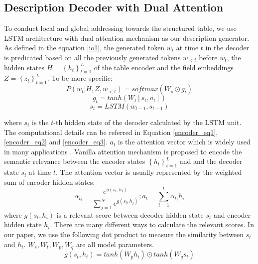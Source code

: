 \documentclass[letterpaper]{article} %
\begin{document}
\subsection{Description Decoder with Dual Attention}
To conduct local and global addressing towards the structured table, we use LSTM architecture with dual attention mechanism as our description generator. As defined in the equation \ref{io1}, the generated token $w_t$  at time $t$ in the decoder is predicated based on all the previously generated tokens $w_{<t}$ before $w_t$, the hidden states $H=\left\{h_t\right\}_{t=1}^{L}$ of the table encoder and the field embeddings $Z=\left\{z_t\right\}_{t=1}^{L}$. To be more specific:
\begin{equation}
P(w_t|H,Z,w_{<t}) = softmax(W_s\odot g_t)
\end{equation}
\begin{equation}
g_t = tanh(W_t[s_t,a_t])
\end{equation}
\begin{equation}
s_t = LSTM(w_{t-1}, s_{t-1})
\end{equation}

where $s_t$ is the $t$-th hidden state of the decoder calculated by the LSTM unit. The computational details can be referred in Equation \ref{encoder_eq1}, \ref{encoder_eq2} and \ref{encoder_eq3}. $a_t$ is the attention vector which is widely used in many applications \cite{xu2015show,luong2014addressing,DBLP:conf/acl/MaSXWLS17}. 
Vanilla attention mechanism is proposed to encode the semantic relevance between the encoder states $\left\{h_t\right\}_{t=1}^{L}$ and and the decoder state $s_t$ at time $t$. The attention vector is usually represented by the weighted sum of encoder hidden states.
\begin{equation}
	  \alpha_{t_i}=\frac{e^{g(s_{t},h_{i})}}{\sum_{j=1}^{N}{e^{g(s_{t},h_{j})}}}; a_t = \sum_{i=1}^L \alpha_{t_i} h_i
\end{equation}
where $g(s_{t},h_{i})$ is a relevant score between decoder hidden state $s_t$ and encoder hidden state $h_i$. There are many different ways to calculate the relevant scores. In our paper, we use the following dot product to measure the similarity between $s_t$ and $h_i$. $W_s,W_t,W_p,W_q$ are all model parameters. 
\begin{equation}
	g(s_{t},h_{i}) = tanh(W_ph_i) \odot tanh(W_qs_t)
\label{de01}
\end{equation}
\end{document}
